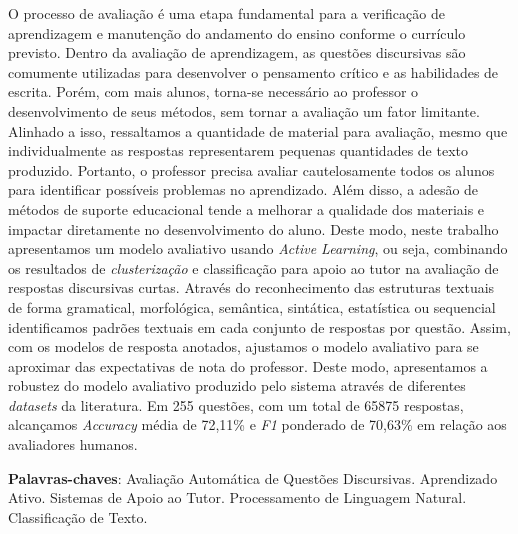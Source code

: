 O processo de avaliação é uma etapa fundamental para a verificação de aprendizagem e manutenção do andamento do ensino conforme o currículo previsto. Dentro da avaliação de aprendizagem, as questões discursivas são comumente utilizadas para desenvolver o pensamento crítico e as habilidades de escrita. Porém, com mais alunos, torna-se necessário ao professor o desenvolvimento de seus métodos, sem tornar a avaliação um fator limitante. Alinhado a isso, ressaltamos a quantidade de material para avaliação, mesmo que individualmente as respostas representarem pequenas quantidades de texto produzido. Portanto, o professor precisa avaliar cautelosamente todos os alunos para identificar possíveis problemas no aprendizado. Além disso, a adesão de métodos de suporte educacional tende a melhorar a qualidade dos materiais e impactar diretamente no desenvolvimento do aluno. Deste modo, neste trabalho apresentamos um modelo avaliativo usando \textit{Active Learning}, ou seja, combinando os resultados de \textit{clusterização} e classificação para apoio ao tutor na avaliação de respostas discursivas curtas. Através do reconhecimento das estruturas textuais de forma gramatical, morfológica, semântica, sintática, estatística ou sequencial identificamos padrões textuais em cada conjunto de respostas por questão. Assim, com os modelos de resposta anotados, ajustamos o modelo avaliativo para se aproximar das expectativas de nota do professor. Deste modo, apresentamos a robustez do modelo avaliativo produzido pelo sistema através de diferentes \textit{datasets} da literatura. Em 255 questões, com um total de 65875 respostas, alcançamos \textit{Accuracy} média de 72,11\% e \textit{F1} ponderado de 70,63\% em relação aos avaliadores humanos.

\textbf{Palavras-chaves}: Avaliação Automática de Questões Discursivas. Aprendizado Ativo. Sistemas de Apoio ao Tutor. Processamento de Linguagem Natural. Classificação de Texto.